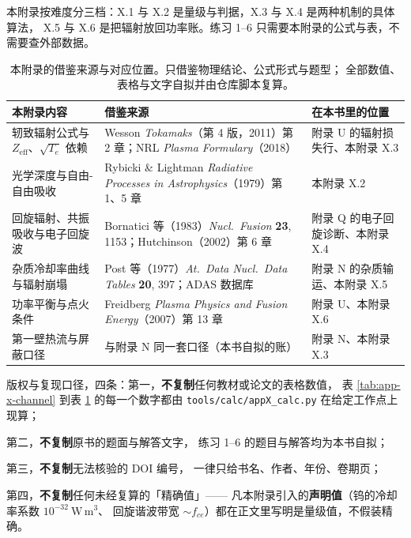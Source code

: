 \begingroup\small
本附录按难度分三档：X.1 与 X.2 是量级与判据，X.3 与 X.4 是两种机制的具体算法，
X.5 与 X.6 是把辐射放回功率账。练习 1--6 只需要本附录的公式与表，不需要查外部数据。

\begin{table}[htbp]
\centering
\small
\caption{本附录的借鉴来源与对应位置。只借鉴物理结论、公式形式与题型；
全部数值、表格与文字自拟并由仓库脚本复算。}
\label{tab:app-x-source}
\begin{tabular}{p{3.4cm}p{5.6cm}p{3.6cm}}
\toprule
本附录内容 & 借鉴来源 & 在本书里的位置 \\
\midrule
轫致辐射公式与 $Z_{\mathrm{eff}}$、$\sqrt{T_e}$ 依赖 &
Wesson \emph{Tokamaks}（第 4 版，2011）第 2 章；NRL \emph{Plasma Formulary}（2018） &
附录 U 的辐射损失行、本附录 X.3 \\
光学深度与自由-自由吸收 &
Rybicki \& Lightman \emph{Radiative Processes in Astrophysics}（1979）第 1、5 章 &
本附录 X.2 \\
回旋辐射、共振吸收与电子回旋波 &
Bornatici 等（1983）\emph{Nucl.\ Fusion} \textbf{23}, 1153；Hutchinson（2002）第 6 章 &
附录 Q 的电子回旋诊断、本附录 X.4 \\
杂质冷却率曲线与辐射崩塌 &
Post 等（1977）\emph{At.\ Data Nucl.\ Data Tables} \textbf{20}, 397；ADAS 数据库 &
附录 N 的杂质输运、本附录 X.5 \\
功率平衡与点火条件 &
Freidberg \emph{Plasma Physics and Fusion Energy}（2007）第 13 章 &
附录 U、本附录 X.6 \\
第一壁热流与屏蔽口径 &
与附录 N 同一套口径（本书自拟的账） &
附录 N、本附录 X.3 \\
\bottomrule
\end{tabular}

\end{table}

版权与复现口径，四条：第一，\textbf{不复制}任何教材或论文的表格数值，
表 \ref{tab:app-x-channel} 到表 \ref{tab:app-x-source} 的每一个数字都由
\texttt{tools/\allowbreak{}calc/\allowbreak{}appX\_calc.py} 在给定工作点上现算；

第二，\textbf{不复制}原书的题面与解答文字，
练习 1--6 的题目与解答均为本书自拟；

第三，\textbf{不复制}无法核验的 DOI 编号，
一律只给书名、作者、年份、卷期页；

第四，\textbf{不复制}任何未经复算的「精确值」——
凡本附录引入的\textbf{声明值}（钨的冷却率系数 $10^{-32}\ \mathrm{W\,m^3}$、
回旋谐波带宽 $\sim f_{ce}$）都在正文里写明是量级值，不假装精确。
\endgroup
